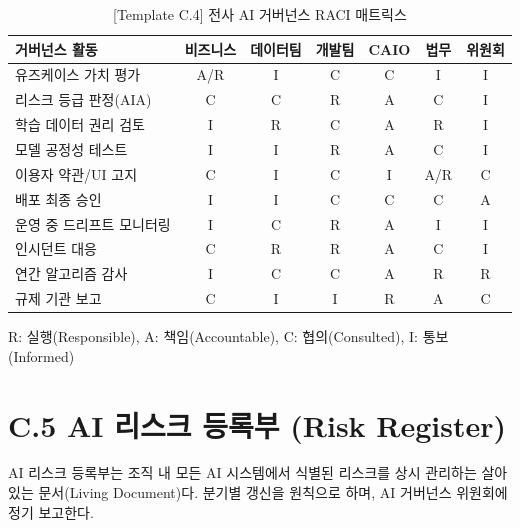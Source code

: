 \begin{table}[htbp]
\centering
\caption{[Template C.4] 전사 AI 거버넌스 RACI 매트릭스}
\begin{tabular}{|l|c|c|c|c|c|c|}
\hline
\textbf{거버넌스 활동} & \textbf{비즈니스} & \textbf{데이터팀} & \textbf{개발팀} & \textbf{CAIO} & \textbf{법무} & \textbf{위원회} \\ \hline
유즈케이스 가치 평가 & A/R & I & C & C & I & I \\ \hline
리스크 등급 판정(AIA) & C & C & R & A & C & I \\ \hline
학습 데이터 권리 검토 & I & R & C & A & R & I \\ \hline
모델 공정성 테스트 & I & I & R & A & C & I \\ \hline
이용자 약관/UI 고지 & C & I & C & I & A/R & C \\ \hline
배포 최종 승인 & I & I & C & C & C & A \\ \hline
운영 중 드리프트 모니터링 & I & C & R & A & I & I \\ \hline
인시던트 대응 & C & R & R & A & C & I \\ \hline
연간 알고리즘 감사 & I & C & C & A & R & R \\ \hline
규제 기관 보고 & C & I & I & R & A & C \\ \hline
\end{tabular}
\end{table}
{\small * R: 실행(Responsible), A: 책임(Accountable), C: 협의(Consulted), I: 통보(Informed)}

\section*{C.5 AI 리스크 등록부 (Risk Register)}

AI 리스크 등록부는 조직 내 모든 AI 시스템에서 식별된 리스크를 상시 관리하는 살아있는 문서(Living Document)다. 분기별 갱신을 원칙으로 하며, AI 거버넌스 위원회에 정기 보고한다.


